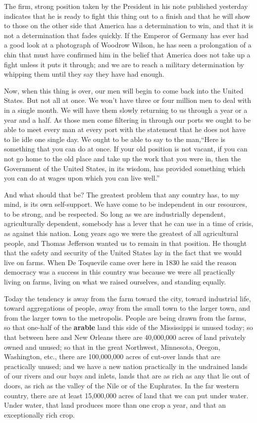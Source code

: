 \begin{linenumbers*}
\indent The firm, strong position taken by the President in his note published yesterday indicates that he is ready to fight this thing out to a finish and that he will show to those on the other side that America has a determination to win, and that it is not a determination that fades quickly. If the Emperor of Germany has ever had a good look at a photograph of Woodrow Wilson, he has seen a prolongation of a chin that must have confirmed him in the belief that America does not take up a fight unless it puts it through; and we are to reach a military determination by whipping them until they say they have had enough.

\indent Now, when this thing is over, our men will begin to come back into the United States. But not all at once. We won't have three or four million men to deal with in a single month. We will have them slowly returning to us through a year or a year and a half. As those men come filtering in through our ports we ought to be able to meet every man at every port with the statement that he does not have to lie idle one single day. We ought to be able to say to the man,``Here is something that you can do at once. If your old position is not vacant, if you can not go home to the old place and take up the work that you were in, then the Government of the United States, in its wisdom, has provided something which you can do at wages upon which you can live well.''

\indent And what should that be? The greatest problem that any country has, to my mind, is its own self-support. We have come to be independent in our resources, to be strong, and be respected. So long as we are industrially dependent, agriculturally dependent, somebody has a lever that he can use in a time of crisis, as against this nation. Long years ago we were the greatest of all agricultural people, and Thomas Jefferson wanted us to remain in that position. He thought that the safety and security of the United States lay in the fact that we would live on farms. When De Toquevile came over here in 1830 he said the reason democracy was a success in this country was because we were all practically living on farms, living on what we raised ourselves, and standing equally.

\indent Today the tendency is away from the farm toward the city, toward industrial life, toward aggregations of people, away from the small town to the larger town, and from the larger town to the metropolis. People are being drawn from the farms, so that one-half of the \textbf{arable} land this side of the Mississippi is unused today; so that between here and New Orleans there are 40,000,000 acres of land privately owned and unused; so that in the great Northwest, Minnesota, Oregon, Washington, etc., there are 100,000,000 acres of cut-over lands that are practically unused; and we have a new nation practically in the undrained lands of our rivers and our bays and inlets, lands that are as rich as any that lie out of doors, as rich as the valley of the Nile or of the Euphrates. In the far western country, there are at least 15,000,000 acres of land that we can put under water. Under water, that land produces more than one crop a year, and that an exceptionally rich crop.


\end{linenumbers*}
